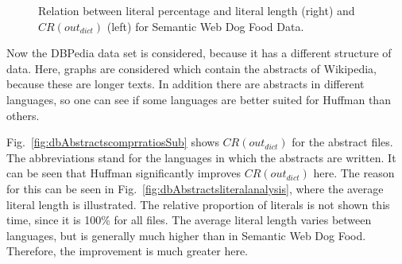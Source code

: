 \begin{figure}[h]
	\centering
	\hfill
	\caption{Relation between literal percentage and literal length (right) and $CR(out_{dict})$ (left) for Semantic Web Dog Food Data.}
	\label{fig:dogfood}
\end{figure}

Now the DBPedia data set is considered, because it has a different structure of data. Here, graphs are considered which contain the abstracts of Wikipedia, because these are longer texts. In addition there are abstracts in different languages, so one can see if some languages are better suited for Huffman than others.

Fig.~\ref{fig:dbAbstractscomprratiosSub} shows $CR(out_{dict})$ for the abstract files. The abbreviations stand for the languages in which the abstracts are written. It can be seen that Huffman significantly improves $CR(out_{dict})$ here. The reason for this can be seen in Fig.~\ref{fig:dbAbstractsliteralanalysis}, where the average literal length is illustrated. The relative proportion of literals is not shown this time, since it is 100\% for all files. The average literal length varies between languages, but is generally much higher than in Semantic Web Dog Food. Therefore, the improvement is much greater here.

